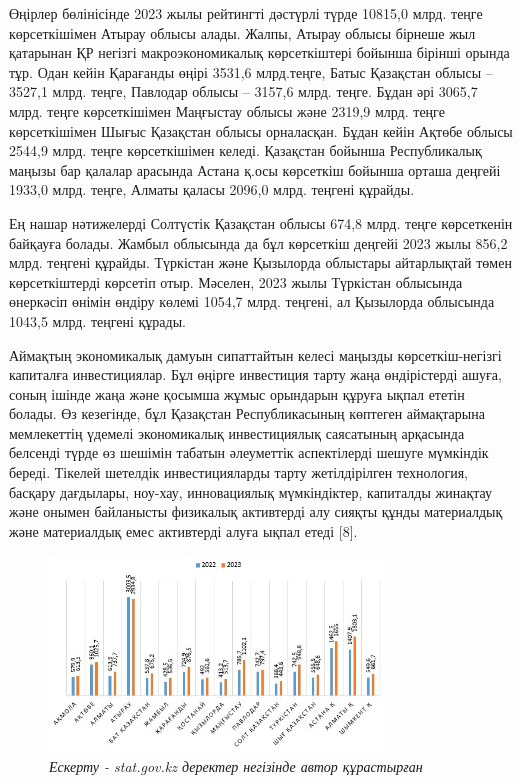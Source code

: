 \begin{multicols}{2}
Өңірлер бөлінісінде 2023 жылы рейтингті дәстүрлі түрде 10815,0 млрд.
теңге көрсеткішімен Атырау облысы алады. Жалпы, Атырау облысы бірнеше
жыл қатарынан ҚР негізгі макроэкономикалық көрсеткіштері бойынша бірінші
орында тұр. Одан кейін Қарағанды өңірі 3531,6 млрд.теңге, Батыс
Қазақстан облысы -- 3527,1 млрд. теңге, Павлодар облысы -- 3157,6 млрд.
теңге. Бұдан әрі 3065,7 млрд. теңге көрсеткішімен Маңғыстау облысы және
2319,9 млрд. теңге көрсеткішімен Шығыс Қазақстан облысы орналасқан.
Бұдан кейін Ақтөбе облысы 2544,9 млрд. теңге көрсеткішімен келеді.
Қазақстан бойынша Республикалық маңызы бар қалалар арасында Астана қ.осы
көрсеткіш бойынша орташа деңгейі 1933,0 млрд. теңге, Алматы қаласы
2096,0 млрд. теңгені құрайды.

Ең нашар нәтижелерді Солтүстік Қазақстан облысы 674,8 млрд. теңге
көрсеткенін байқауға болады. Жамбыл облысында да бұл көрсеткіш деңгейі
2023 жылы 856,2 млрд. теңгені құрайды. Түркістан және Қызылорда
облыстары айтарлықтай төмен көрсеткіштерді көрсетіп отыр. Мәселен, 2023
жылы Түркістан облысында өнеркәсіп өнімін өндіру көлемі 1054,7 млрд.
теңгені, ал Қызылорда облысында 1043,5 млрд. теңгені құрады.

Аймақтың экономикалық дамуын сипаттайтын келесі маңызды
көрсеткіш-негізгі капиталға инвестициялар. Бұл өңірге инвестиция тарту
жаңа өндірістерді ашуға, соның ішінде жаңа және қосымша жұмыс орындарын
құруға ықпал ететін болады. Өз кезегінде, бұл Қазақстан Республикасының
көптеген аймақтарына мемлекеттің үдемелі экономикалық инвестициялық
саясатының арқасында белсенді түрде өз шешімін табатын әлеуметтік
аспектілерді шешуге мүмкіндік береді. Тікелей шетелдік инвестицияларды
тарту жетілдірілген технология, басқару дағдылары, ноу-хау, инновациялық
мүмкіндіктер, капиталды жинақтау және онымен байланысты физикалық
активтерді алу сияқты құнды материалдық және материалдық емес активтерді
алуға ықпал етеді {[}8{]}.

\end{multicols}

\begin{figure}[H]
	\centering
	\includegraphics[width=0.8\textwidth]{media/ekon/image1.3}
	\caption*{2 -- сурет. 2022-2023 жж. ҚР өңірлері бойынша негізгі капиталға
	инвестициялар көлемінің серпіні, млрд. теңге}
	\caption*{{\normalfont \emph{Ескерту - stat.gov.kz деректер негізінде автор құрастырған}}}
\end{figure}

